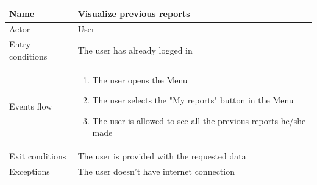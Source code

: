 \documentclass{article}
\begin{document}
\begin{table}[H]
    \begin{tabular}{|l|l|}
    \hline
    Name & \begin{minipage}[t]{0.7\textwidth} Visualize previous reports\end{minipage} \\ \hline  
     Actor & \begin{minipage}[t]{0.7\textwidth} User\end{minipage} \\ \hline 
     Entry conditions & \begin{minipage}[t]{0.7\textwidth} The user has already
     logged in \end{minipage} \\
     \hline 
     Events flow & \begin{minipage}[t]{0.7\textwidth} 
    \begin{enumerate}
        \item The user opens the Menu
        \item The user selects the "My reports" button in the Menu
        \item The user is allowed to see all the previous reports he/she made
    \end{enumerate}    
    \end{minipage} \\ \hline
     Exit conditions & \begin{minipage}[t]{0.7\textwidth} The user is provided
     with the requested data \end{minipage} \\
     \hline
     Exceptions & \begin{minipage}[t]{0.7\textwidth} The user doesn't have
     internet connection  \end{minipage} \\ \hline
    \end{tabular}
\end{table}
\end{document}
